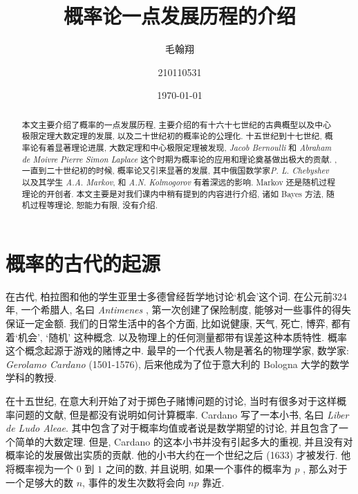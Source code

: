 \documentclass[a4paper, 10pt]{ctexart} %
\title{概率论一点发展历程的介绍}
\date{\today}
\author{毛翰翔 \and 210110531}
\begin{document}
\maketitle 
\begin{abstract}
    本文主要介绍了概率的一点发展历程, 
    主要介绍的有十六十七世纪的古典概型以及中心极限定理大数定理的发展, 
    以及二十世纪初的概率论的公理化. 
    十五世纪到十七世纪, 概率论有着显著理论进展, 大数定理和中心极限定理被发现, \textit{Jacob Bernoulli} 和 \textit{Abraham de Moivre} \textit{Pierre Simon Laplace} 这个时期为概率论的应用和理论奠基做出极大的贡献. 
    , 一直到二十世纪初的时候, 概率论又引来显著的发展, 其中俄国数学家\textit{P. L. Chebyshev} 以及其学生 \textit{A.A. Markov}, 和 \textit{A.N. Kolmogorov} 有着深远的影响. Markov 还是随机过程理论的开创者. 
    本文主要是对我们课内中稍有提到的内容进行介绍, 诸如 Bayes 方法, 随机过程等理论, 恕能力有限, 没有介绍.
\end{abstract}

\section{概率的古代的起源}
在古代, 柏拉图和他的学生亚里士多德曾经哲学地讨论`机会'这个词. 在公元前324年, 一个希腊人, 名曰 {\em Antimenes} , 第一次创建了保险制度, 能够对一些事件的得失保证一定金额. 
我们的日常生活中的各个方面, 比如说健康, 天气, 死亡, 博弈, 都有着`机会', `随机' 这种概念. 
以及物理上的任何测量都带有误差这种本质特性. 
概率这个概念起源于游戏的赌博之中. 
最早的一个代表人物是著名的物理学家, 数学家: {\em Gerolamo Cardano} (1501-1576), 
后来他成为了位于意大利的 Bologna 大学的数学学科的教授. 

在十五世纪, 在意大利开始了对于掷色子赌博问题的讨论, 当时有很多对于这样概率问题的文献, 但是都没有说明如何计算概率. 
Cardano 写了一本小书, 名曰 {\em Liber de Ludo Aleae}. 
其中包含了对于概率均值或者说是数学期望的讨论, 并且包含了一个简单的大数定理. 
但是, Cardano 的这本小书并没有引起多大的重视, 并且没有对概率论的发展做出实质的贡献. 他的小书大约在一个世纪之后 (1633) 才被发行. 他将概率视为一个 $0$ 到 $1$ 之间的数, 并且说明, 如果一个事件的概率为 $p$ , 那么对于一个足够大的数 $n$, 
事件的发生次数将会向 $np$ 靠近. 
\end{document}
